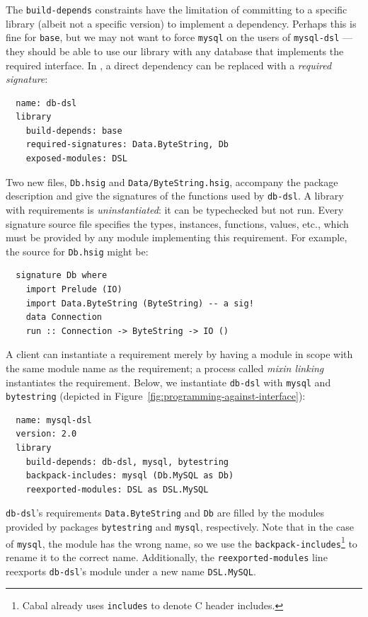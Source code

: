 

The \verb|build-depends|
constraints have the limitation of committing to a specific
library (albeit not a specific version) to implement a dependency.  Perhaps this is fine for
\verb|base|, but we may not want to force \verb|mysql| on the users of \verb|mysql-dsl|
---they should be able to use our library with any database that
implements the required interface.
In \Backpack{}, a direct dependency can be replaced with a
\emph{required signature}:

\begin{verbatim}
  name: db-dsl
  library
    build-depends: base
    required-signatures: Data.ByteString, Db
    exposed-modules: DSL
\end{verbatim}
Two new files, \verb|Db.hsig| and \verb|Data/ByteString.hsig|, accompany the package description and give
the signatures of the functions used by \verb|db-dsl|.
A library with requirements is \emph{uninstantiated}: it can be typechecked but not
run.  Every signature source file specifies the types, instances, functions, values, etc., which must be provided
by any module implementing this requirement.  For example, the source for
\verb|Db.hsig| might be:

\begin{verbatim}
  signature Db where
    import Prelude (IO)
    import Data.ByteString (ByteString) -- a sig!
    data Connection
    run :: Connection -> ByteString -> IO ()
\end{verbatim}
%
A client can instantiate a requirement merely by having a module
in scope with the same module name as the requirement; a process called \emph{mixin linking} instantiates the requirement.  Below, we instantiate \verb|db-dsl| with \verb|mysql| and
\verb|bytestring| (depicted in Figure~\ref{fig:programming-against-interface}):

\begin{verbatim}
  name: mysql-dsl
  version: 2.0
  library
    build-depends: db-dsl, mysql, bytestring
    backpack-includes: mysql (Db.MySQL as Db)
    reexported-modules: DSL as DSL.MySQL
\end{verbatim}
%
\verb|db-dsl|'s requirements \verb|Data.ByteString| and \verb|Db| are
filled by the modules provided by packages \verb|bytestring| and \verb|mysql|,
respectively.  Note that in the case of \verb|mysql|, the module has the wrong
name, so we use the \verb|backpack-includes|\footnote{Cabal already uses
\texttt{includes} to denote C header includes.} to rename it to the correct name.
Additionally, the \verb|reexported-modules| line
reexports \verb|db-dsl|'s module under a new name \verb|DSL.MySQL|.

